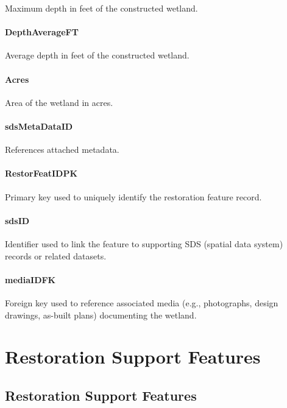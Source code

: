 \documentclass[
  letterpaper,
  DIV=11,
  numbers=noendperiod]{scrreprt}
\begin{document}
Maximum depth in feet of the constructed wetland.

\subsection{DepthAverageFT}\label{depthaverageft}

Average depth in feet of the constructed wetland.

\subsection{Acres}\label{acres-4}

Area of the wetland in acres.

\subsection{sdsMetaDataID}\label{sdsmetadataid-16}

References attached metadata.

\subsection{RestorFeatIDPK}\label{restorfeatidpk-16}

Primary key used to uniquely identify the restoration feature record.

\subsection{sdsID}\label{sdsid-16}

Identifier used to link the feature to supporting SDS (spatial data
system) records or related datasets.

\subsection{mediaIDFK}\label{mediaidfk-16}

Foreign key used to reference associated media (e.g., photographs,
design drawings, as-built plans) documenting the wetland.

\part{Restoration Support Features}

\chapter{Restoration Support
Features}\label{restoration-support-features-1}
\end{document}
